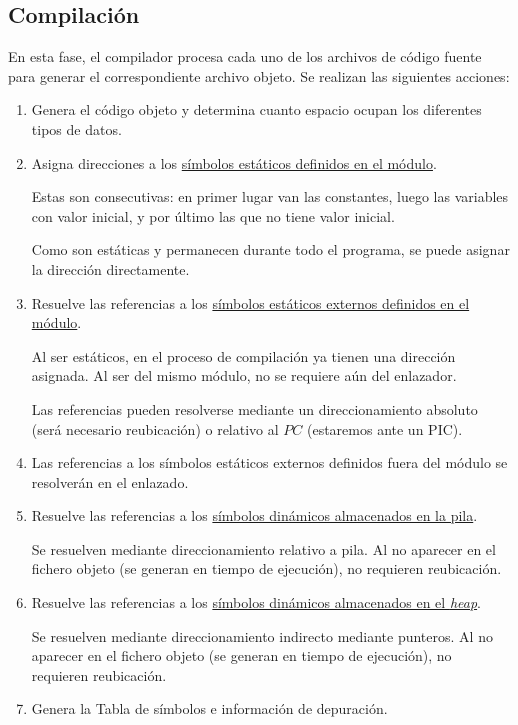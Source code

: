 \subsection{Compilación}
En esta fase, el compilador procesa cada uno de los archivos de código fuente para generar el correspondiente archivo objeto. Se realizan las siguientes acciones:
\begin{enumerate}
    \item Genera el código objeto y determina cuanto espacio ocupan los diferentes tipos de datos.

    \item Asigna direcciones a los \underline{símbolos estáticos definidos en el módulo}.
    
    Estas son consecutivas: en primer lugar van las constantes, luego las variables con valor inicial, y por último las que no tiene valor inicial.

    Como son estáticas y permanecen durante todo el programa, se puede asignar la dirección directamente.

    \item Resuelve las referencias a los \underline{símbolos estáticos externos definidos en el módulo}.

    Al ser estáticos, en el proceso de compilación ya tienen una dirección asignada. Al ser del mismo módulo, no se requiere aún del enlazador.

    Las referencias pueden resolverse mediante un direccionamiento absoluto (será necesario reubicación) o relativo al $PC$ (estaremos ante un PIC).

    \item Las referencias a los símbolos estáticos externos definidos fuera del módulo se resolverán en el enlazado.

    \item Resuelve las referencias a los \underline{símbolos dinámicos almacenados en la pila}.

    Se resuelven mediante direccionamiento relativo a pila. Al no aparecer en el fichero objeto (se generan en tiempo de ejecución), no requieren reubicación.

    \item Resuelve las referencias a los \underline{símbolos dinámicos almacenados en el \textit{heap}}.

    Se resuelven mediante direccionamiento indirecto mediante punteros. Al no aparecer en el fichero objeto (se generan en tiempo de ejecución), no requieren reubicación.

    \item Genera la Tabla de símbolos e información de depuración.
\end{enumerate}


